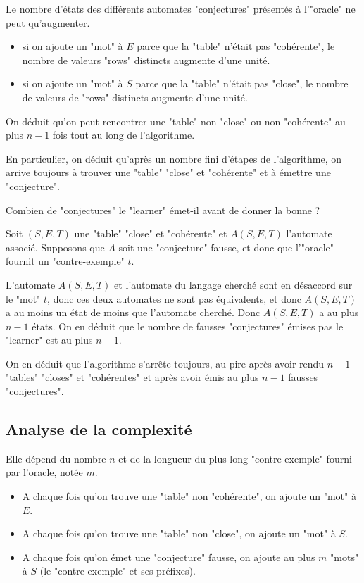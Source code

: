 \begin{remarque}
	Le nombre d'états des différents automates "conjectures" présentés à l'"oracle" ne peut qu'augmenter.
	\begin{itemize}
		\item si on ajoute un "mot" à $E$ parce que la "table" n'était pas "cohérente", le nombre de valeurs "rows" distincts augmente
		      d'une unité.
		\item si on ajoute un "mot" à $S$ parce que la "table" n'était pas "close", le nombre de valeurs de "rows" distincts augmente d'une unité.
	\end{itemize}
	On déduit qu'on peut rencontrer une "table" non "close" ou non "cohérente" au plus $n-1$ fois tout au long de l'algorithme.

	En particulier, on déduit qu'après un nombre fini d'étapes de l'algorithme, on arrive toujours à trouver
	une "table" "close" et "cohérente" et à émettre une "conjecture".
\end{remarque}


Combien de "conjectures" le "learner" émet-il avant de donner la bonne ?

Soit $(S,E,T)$ une "table" "close" et "cohérente" et $A(S,E,T)$ l'automate associé.
Supposons que $A$ soit une "conjecture" fausse, et donc que l'"oracle" fournit un "contre-exemple" $t$.

L'automate $A(S,E,T)$ et l'automate du langage cherché sont en désaccord sur le "mot" $t$, donc ces deux automates
ne sont pas équivalents, et donc $A(S,E,T)$ a au moins un état de moins que l'automate cherché.
Donc $A(S,E,T)$ a au plus $n-1$ états. On en déduit que le nombre de fausses "conjectures" émises pas le "learner" est au plus $n-1$.

On en déduit que l'algorithme s'arrête toujours, au pire après avoir rendu $n-1$ "tables" "closes" et
"cohérentes" et après avoir émis au plus $n-1$ fausses "conjectures".


\subsection{Analyse de la complexité}

Elle dépend du nombre $n$ et de la longueur du plus long "contre-exemple" fourni par l'oracle, notée $m$.


\begin{itemize}
	\item A chaque fois qu'on trouve une "table" non "cohérente", on ajoute un "mot" à $E$.
	\item A chaque fois qu'on trouve une "table" non "close", on ajoute un "mot" à $S$.
	\item A chaque fois qu'on émet une "conjecture" fausse, on ajoute au plus $m$ "mots" à $S$ (le "contre-exemple" et ses préfixes).
\end{itemize}

